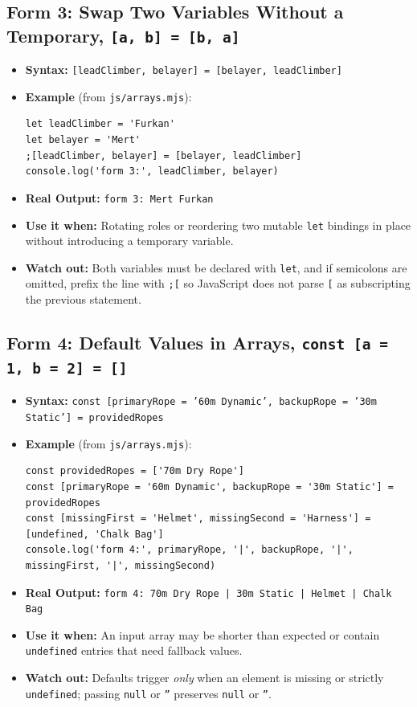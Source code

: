 \documentclass[11pt, a4paper]{article}
\begin{document}
\subsection{Form 3: Swap Two Variables Without a Temporary, \texttt{[a, b] = [b, a]}}
\begin{itemize}
  \item \textbf{Syntax:} \texttt{[leadClimber, belayer] = [belayer, leadClimber]}
  \item \textbf{Example} (from \texttt{js/arrays.mjs}):
\begin{lstlisting}
let leadClimber = 'Furkan'
let belayer = 'Mert'
;[leadClimber, belayer] = [belayer, leadClimber]
console.log('form 3:', leadClimber, belayer)
\end{lstlisting}
  \item \textbf{Real Output:} \texttt{form 3: Mert Furkan}
  \item \textbf{Use it when:} Rotating roles or reordering two mutable \texttt{let} bindings in place without introducing a temporary variable.
  \item \textbf{Watch out:} Both variables must be declared with \texttt{let}, and if semicolons are omitted, prefix the line with \texttt{;[} so JavaScript does not parse \texttt{[} as subscripting the previous statement.
\end{itemize}

\subsection{Form 4: Default Values in Arrays, \texttt{const [a = 1, b = 2] = []}}
\begin{itemize}
  \item \textbf{Syntax:} \texttt{const [primaryRope = '60m Dynamic', backupRope = '30m Static'] = providedRopes}
  \item \textbf{Example} (from \texttt{js/arrays.mjs}):
\begin{lstlisting}
const providedRopes = ['70m Dry Rope']
const [primaryRope = '60m Dynamic', backupRope = '30m Static'] = providedRopes
const [missingFirst = 'Helmet', missingSecond = 'Harness'] = [undefined, 'Chalk Bag']
console.log('form 4:', primaryRope, '|', backupRope, '|', missingFirst, '|', missingSecond)
\end{lstlisting}
  \item \textbf{Real Output:} \texttt{form 4: 70m Dry Rope | 30m Static | Helmet | Chalk Bag}
  \item \textbf{Use it when:} An input array may be shorter than expected or contain \texttt{undefined} entries that need fallback values.
  \item \textbf{Watch out:} Defaults trigger \emph{only} when an element is missing or strictly \texttt{undefined}; passing \texttt{null} or \texttt{''} preserves \texttt{null} or \texttt{''}.
\end{itemize}
\end{document}
